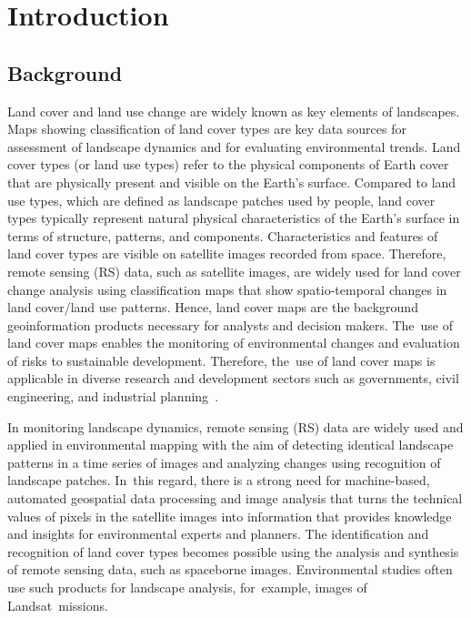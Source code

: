 \documentclass[earth,article,accept,pdftex,moreauthors]{Definitions/mdpi}
\begin{document}
\section{Introduction}


\subsection{Background}
{Land cover and land use change are widely known as key elements of landscapes. Maps {showing classification of land cover types} are key data sources for assessment of landscape dynamics and for evaluating environmental trends. }Land cover types (or land use types) refer to {the} physical{ }components of Earth cover {that are physically present and visible on the Earth's surface}. Compared to land use types, which are defined as landscape patches{ }used by{ }people, land cover types  typically represent {natural }physical characteristics of the Earth's surface in terms of structure, patterns, and components. {Characteristics and features of land cover types are visible on  satellite images recorded from space}. {Therefore, }remote {sensing} (RS) data, such as satellite images, are widely used for land cover change analysis {using} classification maps {that show} spatio-temporal changes in land cover/land use patterns. Hence, {land }cover maps are the background geoinformation products necessary for analysts and decision makers. The~use of land cover maps enables the monitoring of environmental changes and evaluation of risks to sustainable development. Therefore, the~use of land cover maps is applicable in diverse research and development sectors such as governments, civil engineering, and industrial planning~\cite{9553499}.

{In monitoring landscape dynamics, {remote sensing} (RS) data are widely used and applied in environmental mapping {with the aim of detecting} identical landscape patterns in a time series of images and{ }analyzing changes using recognition of landscape patches. In~this regard, there is a strong need for machine-based, automated geospatial data processing and image analysis that turns the technical values of pixels in the satellite images into information that provides knowledge and insights for environmental experts and planners. The} identification{ and recognition of land cover types becomes }possible using {the }analysis and synthesis of remote sensing data, such as spaceborne images. Environmental studies often use {such} products{ for landscape analysis, for~example, images }of Landsat~missions. 
\end{document}
